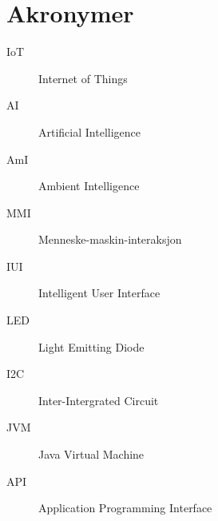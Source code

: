 \chapter{Akronymer}
\begin{description}
\item[IoT] Internet of Things
\item[AI] Artificial Intelligence
\item[AmI] Ambient Intelligence
\item[MMI] Menneske-maskin-interaksjon
\item[IUI] Intelligent User Interface
\item[LED] Light Emitting Diode
\item[I2C] Inter-Intergrated Circuit
\item[JVM] Java Virtual Machine
\item[API] Application Programming Interface
\end{description}